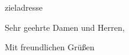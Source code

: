 \documentclass[fontsize=12pt,paper=a4,DIN]{scrlttr2}
\begin{document}
\begin{letter}{zieladresse}


\opening{Sehr geehrte Damen und Herren,}


\closing{Mit freundlichen Grüßen}


\end{letter}
\end{document}
